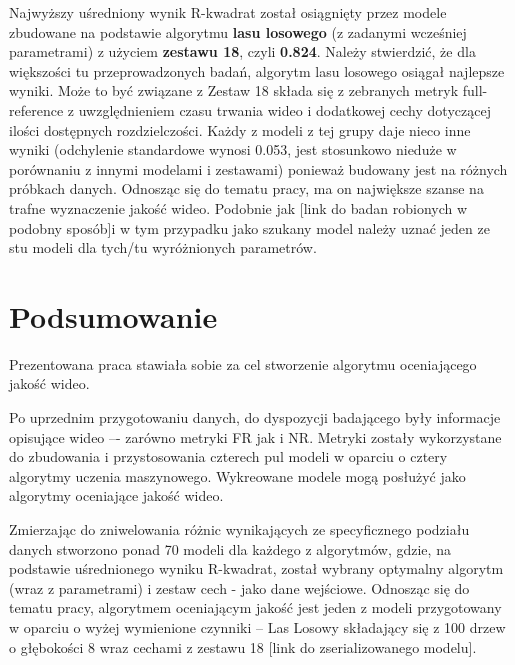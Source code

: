Najwyższy uśredniony wynik R-kwadrat został osiągnięty przez modele zbudowane na podstawie algorytmu \textbf{lasu losowego} (z zadanymi wcześniej parametrami) z użyciem \textbf{zestawu 18}, czyli \textbf{0.824}. Należy stwierdzić, że dla większości tu przeprowadzonych badań, algorytm lasu losowego osiągał najlepsze wyniki. Może to być związane z   Zestaw 18 składa się z  zebranych metryk full-reference z uwzględnieniem czasu trwania wideo i dodatkowej cechy dotyczącej ilości dostępnych rozdzielczości. Każdy z modeli z tej grupy daje nieco inne  wyniki (odchylenie standardowe wynosi 0.053, jest stosunkowo nieduże w porównaniu z innymi modelami i zestawami) ponieważ budowany jest na różnych próbkach danych.  Odnosząc się do tematu pracy, ma on największe szanse na trafne wyznaczenie jakość wideo. Podobnie jak [link do badan robionych w podobny sposób]i w tym przypadku jako szukany model należy uznać jeden ze stu modeli dla tych/tu wyróżnionych parametrów. 



\chapter{Podsumowanie}



Prezentowana praca stawiała sobie za cel stworzenie algorytmu oceniającego jakość wideo.

Po uprzednim przygotowaniu danych, do dyspozycji badającego były informacje opisujące wideo –- zarówno metryki FR jak i NR. Metryki zostały wykorzystane do zbudowania i przystosowania czterech pul modeli w oparciu o  cztery algorytmy uczenia maszynowego. Wykreowane modele mogą posłużyć jako algorytmy oceniające jakość wideo.

Zmierzając do zniwelowania różnic wynikających ze specyficznego podziału danych stworzono ponad 70 modeli dla każdego z algorytmów, gdzie, na podstawie uśrednionego wyniku R-kwadrat, został wybrany optymalny algorytm (wraz z parametrami) i zestaw cech - jako dane wejściowe. Odnosząc się do tematu pracy, algorytmem oceniającym jakość jest jeden z modeli przygotowany w oparciu o wyżej wymienione czynniki -- Las Losowy składający się z 100 drzew o głębokości 8 wraz cechami z zestawu 18 [link do zserializowanego modelu].

